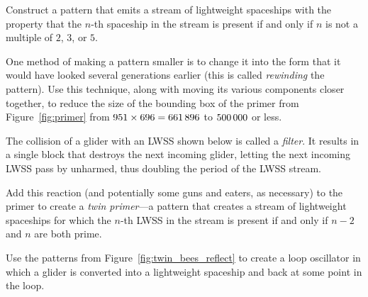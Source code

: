 \begin{multicols}{2}
	
	\mfilbreak
	
	
	\begin{problem}\label{exer:period_not_235_gun}
		Construct a pattern that emits a stream of lightweight spaceships with the property that the $n$-th spaceship in the stream is present if and only if $n$ is not a multiple of $2$, $3$, or $5$.
	\end{problem}
	
	
	\mfilbreak
	
	
	\begin{problem}\label{exer:rewind_primer}
		One method of making a pattern smaller is to change it into the form that it would have looked several generations earlier (this is called \emph{rewinding} the pattern). Use this technique, along with moving its various components closer together, to reduce the size of the bounding box of the primer from Figure~\ref{fig:primer} from $951 \times 696 = 661{\,}896$ to $500{\,}000$ or less.
	\end{problem}
	
	
	\mfilbreak
	
	
	\begin{problem}\label{exer:twin_primer}
		The collision of a glider with an LWSS shown below is called a \emph{filter}. It results in a single block that destroys the next incoming glider, letting the next incoming LWSS pass by unharmed, thus doubling the period of the LWSS stream.
		
		Add this reaction (and potentially some guns and eaters, as necessary) to the primer to create a \emph{twin primer}---a pattern that creates a stream of lightweight spaceships for which the $n$-th LWSS in the stream is present if and only if $n-2$ and $n$ are both prime.
		
		\begin{center}
		\end{center}
	\end{problem}
	
	
	\mfilbreak
	
	
	\begin{problem}\label{exer:twin_bees_loop}
		Use the patterns from Figure~\ref{fig:twin_bees_reflect} to create a loop oscillator in which a glider is converted into a lightweight spaceship and back at some point in the loop.
	\end{problem}
	

\end{multicols}
